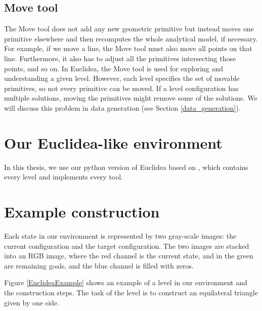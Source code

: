\subsection{Move tool}
\label{move_tool_definition}
The Move tool does not add any new geometric primitive but instead moves one primitive elsewhere and then recomputes the whole analytical model, if necessary. For example, if we move a line, the Move tool must also move all points on that line. Furthermore, it also has to adjust all the primitives intersecting those points, and so on. In Euclidea, the Move tool is used for exploring and understanding a given level. However, each level specifies the set of movable primitives, so not every primitive can be moved.
\newline
\newline
If a level configuration has multiple solutions, moving the primitives might remove some of the solutions. We will discuss this problem in data generation (see Section \ref{data_generation}).

\section{Our Euclidea-like environment}
In this thesis, we use our python version of Euclidea based on \cite{py_euclidea}, which contains every level and implements every tool.

\section{Example construction}
\label{euclidea_vizualization}
Each state in our environment is represented by two gray-scale images: the current configuration and the target configuration. The two images are stacked into an RGB image, where the red channel is the current state, and in the green are remaining goals, and the blue channel is filled with zeros. 

Figure \ref{EuclideaExample} shows an example of a level in our environment and the construction steps. The task of the level is to construct an equilateral triangle given by one side.

